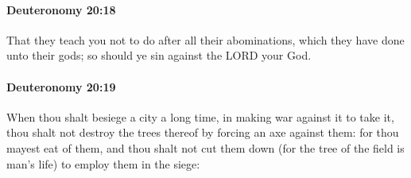 		\paragraph{Deuteronomy 20:18} %
			\label{DEUTERONOMY-20-18}

			That they teach you not to do after all their abominations, which they have done unto their gods; so should ye sin against the LORD your God.


		\paragraph{Deuteronomy 20:19} %
			\label{DEUTERONOMY-20-19}

			When thou shalt besiege a city a long time, in making war against it to take it, thou shalt not destroy the trees thereof by forcing an axe against them: for thou mayest eat of them, and thou shalt not cut them down (for the tree of the field is man's life) to employ them in the siege:

